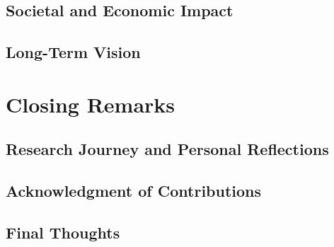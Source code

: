 \subsection{Societal and Economic Impact}

\subsection{Long-Term Vision}

\section{Closing Remarks}

\subsection{Research Journey and Personal Reflections}

\subsection{Acknowledgment of Contributions}

\subsection{Final Thoughts}

